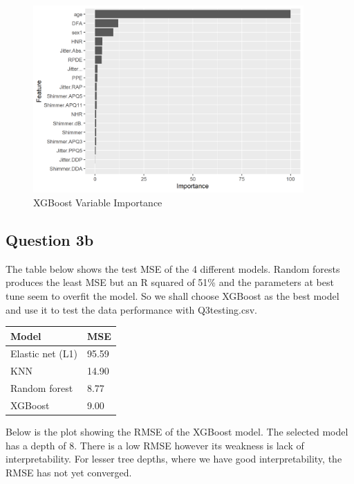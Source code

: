 \documentclass[
]{article}
\begin{document}
\begin{figure}
\centering
\includegraphics[width=4.07292in,height=\textheight]{varimpo_xgboost.png}
\caption{XGBoost Variable Importance}
\end{figure}

\hypertarget{question-3b}{%
\subsection{Question 3b}\label{question-3b}}

The table below shows the test MSE of the 4 different models. Random
forests produces the least MSE but an R squared of 51\% and the
parameters at best tune seem to overfit the model. So we shall choose
XGBoost as the best model and use it to test the data performance with
Q3testing.csv.

\begin{longtable}[]{@{}ll@{}}
\toprule\noalign{}
Model & MSE \\
\midrule\noalign{}
\endhead
\bottomrule\noalign{}
\endlastfoot
Elastic net (L1) & 95.59 \\
KNN & 14.90 \\
Random forest & 8.77 \\
XGBoost & 9.00 \\
\end{longtable}

Below is the plot showing the RMSE of the XGBoost model. The selected
model has a depth of 8. There is a low RMSE however its weakness is lack
of interpretability. For lesser tree depths, where we have good
interpretability, the RMSE has not yet converged.
\end{document}
